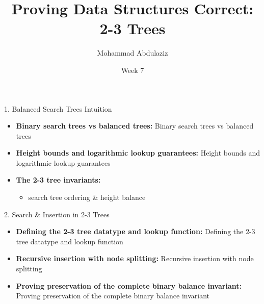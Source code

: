 \documentclass[compress,10pt,xcolor=dvipsnames]{beamer}
\title[Proving Data Structures Correct]{Proving Data Structures Correct: 2-3 Trees}
\author[7CCSACTP]{Mohammad Abdulaziz}
\date{Week 7}
\begin{document}

\begin{frame}{1. Balanced Search Trees Intuition}

\begin{itemize}
  \item \textbf{Binary search trees vs balanced trees:} Binary search trees vs balanced trees
  \item \textbf{Height bounds and logarithmic lookup guarantees:} Height bounds and logarithmic lookup guarantees
  \item \textbf{The 2-3 tree invariants:}
    \begin{itemize}
      \item search tree ordering & height balance
    \end{itemize}
\end{itemize}
\end{frame}

\begin{frame}{2. Search & Insertion in 2-3 Trees}

\begin{itemize}
  \item \textbf{Defining the 2-3 tree datatype and lookup function:} Defining the 2-3 tree datatype and lookup function
  \item \textbf{Recursive insertion with node splitting:} Recursive insertion with node splitting
  \item \textbf{Proving preservation of the complete binary balance invariant:} Proving preservation of the complete binary balance invariant
\end{itemize}
\end{frame}
\end{document}
